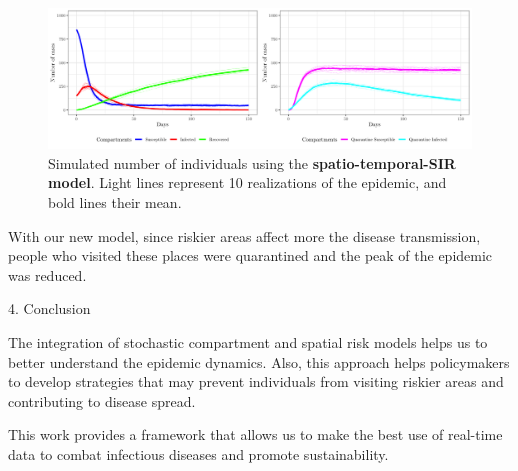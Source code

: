 \documentclass[12pt]{beamer}
\begin{document}
\begin{frame}[t]
\begin{columns}[t]
\begin{column}{0.30\textwidth}
				\begin{figure}[!ht]
					\centering
					\includegraphics[width = 1\textwidth]{Images/fitted-temporal}
					\caption{\justifying Simulated number of individuals using the \textbf{spatio-temporal-SIR model}. Light lines represent 10 realizations of the epidemic, and bold lines their mean.}
					\label{fig:fitted-temporal}
				\end{figure}\vspace{-6pt}
			
			With our new model,  since riskier areas affect more the disease transmission, people who visited these places were quarantined and the peak of the epidemic was reduced.\vspace{12pt}
			
			\begin{block}{\Large 4. Conclusion}\justifying \vspace{12pt}
				
				The integration of stochastic compartment and spatial risk models helps us to better understand the epidemic dynamics. Also, this approach helps policymakers to develop strategies that may prevent individuals from visiting riskier areas and contributing to disease spread.\vspace{12pt} 
				
			    This work provides a framework that allows us to make the best use of real-time data to combat infectious diseases and promote sustainability.\vspace{12pt} 
				
				
			\end{block}
		

\end{column}
\end{columns}
\end{frame}
\end{document}
